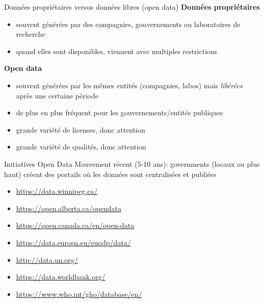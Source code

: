 \documentclass[
  ignorenonframetext,
]{beamer}
\providecommand{\tightlist}{%
  \setlength{\itemsep}{0pt}\setlength{\parskip}{0pt}}
\begin{document}
\begin{frame}{Données propriétaires versus données libres (open data)}
\protect\hypertarget{donnuxe9es-propriuxe9taires-versus-donnuxe9es-libres-open-data}{}
\textbf{Données propriétaires}

\begin{itemize}
\tightlist
\item
  souvent générées par des compagnies, gouvernements ou laboratoires de
  recherche
\item
  quand elles sont disponibles, viennent avec multiples restrictions
  \vfill
\end{itemize}

\textbf{Open data}

\begin{itemize}
\tightlist
\item
  souvent générées par les mêmes entités (compagnies, labos) mais
  \emph{libérées} après une certaine période
\item
  de plus en plus fréquent pour les gouvernements/entités publiques
\item
  grande variété de licenses, donc attention
\item
  grande variété de qualités, donc attention
\end{itemize}
\end{frame}

\begin{frame}{Initiatives Open Data}
\protect\hypertarget{initiatives-open-data}{}
Mouvement récent (5-10 ans): governments (locaux ou plus haut) créent
des portails où les données sont centralisées et publiées

\begin{itemize}
\tightlist
\item
  \url{https://data.winnipeg.ca/}
\item
  \url{https://open.alberta.ca/opendata}
\item
  \url{https://open.canada.ca/en/open-data}
\item
  \url{https://data.europa.eu/euodp/data/}
\item
  \url{http://data.un.org/}
\item
  \url{https://data.worldbank.org/}
\item
  \url{https://www.who.int/gho/database/en/}
\end{itemize}
\end{frame}
\end{document}
